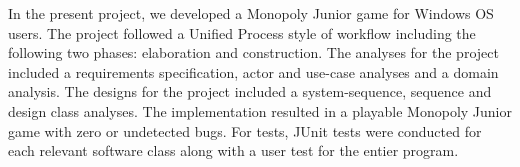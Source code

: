 \begin{flushleft} %

\doublespacing

In the present project, we developed a Monopoly Junior game for Windows OS users. The project followed a Unified Process style of workflow including the following two phases: elaboration and construction. The analyses for the project included a requirements specification, actor and use-case analyses and a domain analysis. The designs for the project included a system-sequence, sequence and design class analyses. The implementation resulted in a playable Monopoly Junior game with zero or undetected bugs. For tests, JUnit tests were conducted for each relevant software class along with a user test for the entier program. 

\end{flushleft}